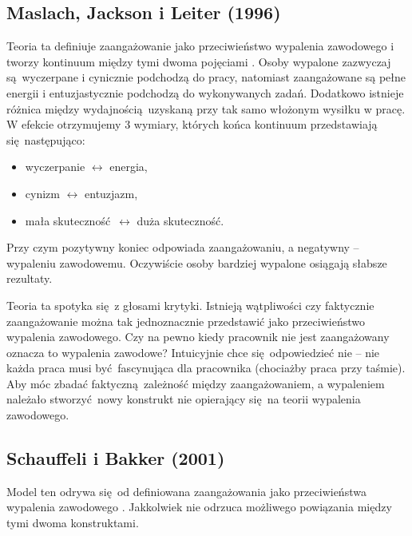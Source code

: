 \subsection{Maslach, Jackson i Leiter (1996)}
\label{sec:model-maslach}
Teoria ta definiuje zaangażowanie jako przeciwieństwo wypalenia zawodowego i tworzy kontinuum między tymi dwoma pojęciami \cite{maslach1997truth}. Osoby wypalone zazwyczaj są wyczerpane i cynicznie podchodzą do pracy, natomiast zaangażowane są pełne energii i entuzjastycznie podchodzą do wykonywanych zadań. Dodatkowo istnieje różnica między wydajnością uzyskaną przy tak samo włożonym wysiłku w pracę. W efekcie otrzymujemy 3 wymiary, których końca kontinuum przedstawiają
się następująco:
\begin{itemize}
\item wyczerpanie $\leftrightarrow$ energia,
\item cynizm $\leftrightarrow$ entuzjazm,
\item mała skuteczność $\leftrightarrow$ duża skuteczność.
\end{itemize}
Przy czym pozytywny koniec odpowiada zaangażowaniu, a negatywny -- wypaleniu zawodowemu. Oczywiście osoby bardziej wypalone osiągają słabsze rezultaty.

Teoria ta spotyka się z głosami krytyki. Istnieją wątpliwości czy faktycznie zaangażowanie można tak jednoznacznie przedstawić jako przeciwieństwo wypalenia zawodowego. Czy na pewno kiedy pracownik nie jest zaangażowany oznacza to wypalenia zawodowe? Intuicyjnie chce się odpowiedzieć nie -- nie każda praca musi być fascynująca dla pracownika (chociażby praca przy taśmie). Aby móc zbadać faktyczną zależność między zaangażowaniem, a wypaleniem należało stworzyć nowy konstrukt nie opierający się na teorii wypalenia zawodowego.

\subsection{Schauffeli i Bakker (2001)}
\label{sec:model-schauffeli}
Model ten odrywa się od definiowana zaangażowania jako przeciwieństwa wypalenia zawodowego \cite{schaufeli2002measurement}. Jakkolwiek nie odrzuca możliwego powiązania między tymi dwoma konstruktami. 

